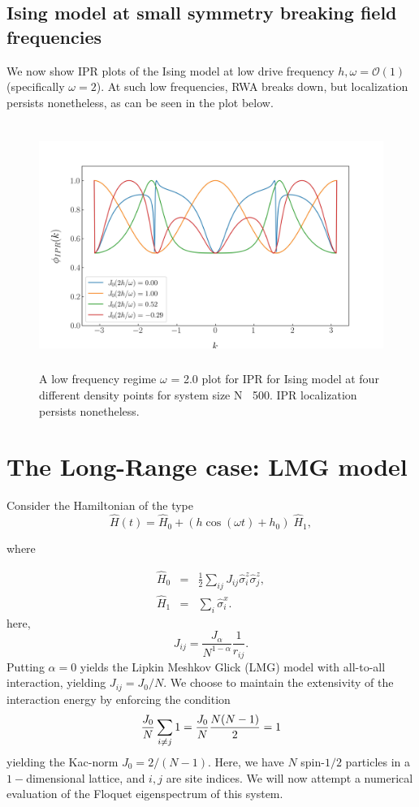 \documentclass{article}
\begin{document}
\subsection{Ising model at small symmetry breaking field frequencies}
We now show IPR plots of the Ising model at low drive frequency $h, \omega = \mathcal{O}(1)$ (specifically $\omega=2$). At such low frequencies, RWA breaks down, but localization persists nonetheless, as can be seen in the {\color{blue} plot} below.
\begin{figure}[ht!]
\centering
\includegraphics[height = 8.0cm, width =13cm]{low_frq_exactN500_ipr.jpeg}
\caption{\color{blue} A low frequency regime $\omega$ = 2.0 plot for IPR for Ising model at four different density points for system size N $~$ 500. IPR localization persists nonetheless. }
\end{figure}

\section{The Long-Range case: LMG model}

Consider the Hamiltonian of the type
\begin{equation}
\hat{H}(t) = \hat{H}_0 + \left(h \cos{(\omega t)} + h_0\right)\; \hat{H}_1,
\end{equation}

where

\begin{eqnarray}
\hat{H}_0 &=& \frac12 \sum_{ij}J_{ij}\hat{\sigma}^z_i\hat{\sigma}^z_j,\\
\hat{H}_1 &=& \sum_i\hat{\sigma}^x_i.
\end{eqnarray}
here,
\begin{equation*}
J_{ij} =\frac{J_\alpha}{N^{1-\alpha}}\frac{1}{r_{ij}}.
\end{equation*}
Putting  $\alpha = 0$ yields the Lipkin Meshkov Glick (LMG) \cite{lipkin64} model with all-to-all interaction, yielding $J_{ij} = J_0/N$. We choose to maintain the extensivity of the interaction energy by enforcing the condition
\begin{equation*}
\frac{J_0}{N} \sum_{i\neq j}1=\frac{J_0}{N}\frac{N(N-1)}{2}=1\\
\end{equation*}
yielding the Kac-norm $J_0=2/(N-1)$. Here, we have $N$ spin-$1/2$ particles in a $1-$dimensional lattice, and $i,j$ are site indices. We will now attempt a numerical evaluation of
the Floquet eigenspectrum of this system.
\end{document}
